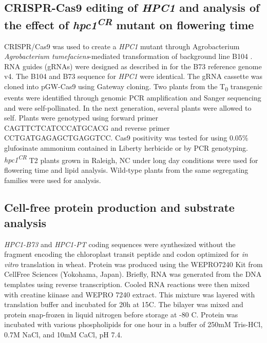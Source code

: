\documentclass[9pt,twocolumn,twoside,lineno]{biorxiv}
\newcommand{\hpc}{\textit{HPC1}\xspace}
\begin{document}
\subsection{CRISPR-Cas9 editing of \hpc and analysis of the effect of \textit{hpc1\textsuperscript{CR}} mutant on flowering time}
CRISPR/Cas9 was used to create a \hpc mutant through Agrobacterium \textit{Agrobacterium tumefaciens}-mediated transformation of background line B104 \cite{Wu2020-nq, Char2017-uk}. 
RNA guides (gRNAs) were designed as described in \cite{Brazelton2015-co} for the B73 reference genome v4. 
The B104 and B73 sequence for \hpc were identical. 
The gRNA cassette was cloned into pGW-Cas9 using Gateway cloning. 
Two plants from the T\textsubscript{0} transgenic events were identified through genomic PCR amplification and Sanger sequencing and were self-pollinated. 
In the next generation, several plants were allowed to self.
Plants were genotyped using forward primer CAGTTCTCATCCCATGCACG and reverse primer CCTGATGAGAGCTGAGGTCC.
Cas9 positivity was tested for using 0.05\% glufosinate ammonium contained in Liberty herbicide or by PCR genotyping. 
\textit{hpc1\textsuperscript{CR}} T2 plants grown in Raleigh, NC under long day conditions were used for flowering time and lipid analysis.
Wild-type plants from the same segregating families were used for analysis.
\subsection{Cell-free protein production and substrate analysis}
\textit{HPC1-B73} and \textit{HPC1-PT} coding sequences were synthesized without the fragment encoding the chloroplast transit peptide and codon optimized for \textit{in vitro} translation in wheat. 
Protein was produced using the WEPRO7240 Kit from CellFree Sciences (Yokohama, Japan).
Briefly, RNA was generated from the DNA templates using reverse transcription. 
Cooled RNA reactions were then mixed with creatine kiinase and WEPRO 7240 extract. 
This mixture was layered with translation buffer and incubated for 20h at 15\textdegree C.
The bilayer was mixed and protein snap-frozen in liquid nitrogen before storage at -80 \textdegree C.
Protein was incubated with various phospholipids for one hour in a buffer of 250mM Tris-HCl, 0.7M NaCl, and 10mM CaCl, pH 7.4.
\end{document}
